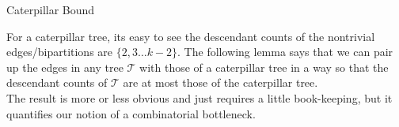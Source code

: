 \documentclass[11pt,aspectratio=169]{beamer}
\begin{document}
\begin{frame}{Caterpillar Bound}
{  \vspace{0.5em}

  For a caterpillar tree, its easy to see the descendant counts of the nontrivial edges/bipartitions are $\{2,3\ldots k-2\}$. The
  following lemma says that we can pair up the edges in any tree $\mathcal{T}$ with those of a caterpillar tree in a way so that
  the descendant counts of $\mathcal{T}$ are at most those of the caterpillar tree. \\

  \vspace{0.5em}
  The result is more or less obvious and just requires a little book-keeping, but it quantifies our notion
  of a combinatorial bottleneck. 


}
\end{frame}

\end{document}

